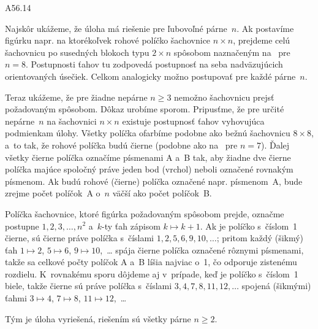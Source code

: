 {%
\fontplace[13] \hfil\Obr

\epsplace A56.14
\hfil\Obr

Najskôr ukážeme, že úloha má riešenie pre ľubovoľné párne~$n$.
Ak postavíme figúrku napr. na ktorékoľvek rohové políčko šachovnice
$n\times n$, prejdeme celú šachovnicu po susedných blokoch typu
$2\times n$ spôsobom naznačeným na \obr\ pre $n=8$. Postupnosti
ťahov tu zodpovedá postupnosť na seba nadväzujúcich orientovaných
úsečiek. Celkom analogicky možno postupovať pre každé párne~$n$.

\twocpictures

Teraz ukážeme, že pre žiadne nepárne $n\ge3$ nemožno šachovnicu prejsť
požadovaným spôsobom. Dôkaz urobíme sporom. Pripusťme, že pre
určité nepárne~$n$ na šachovnici $n\times n$ existuje postupnosť
ťahov vyhovujúca podmienkam úlohy. Všetky políčka ofarbíme
podobne ako bežnú šachovnicu $8\times 8$, a~to tak, že
rohové políčka budú čierne (podobne ako na \obr\ pre $n=7$). Ďalej
všetky čierne políčka označíme písmenami A a~B tak, aby žiadne dve
čierne políčka majúce spoločný práve jeden bod (vrchol) neboli
označené rovnakým písmenom. Ak budú rohové (čierne) políčka označené
napr. písmenom~A, bude zrejme počet políčok~A o~$n$ väčší ako počet
políčok~B.

Políčka šachovnice, ktoré figúrka požadovaným spôsobom prejde,
označme postupne $1,2,3,\dots ,n^2$ a~$k$-ty ťah zápisom
$k\mapsto k+1$. Ak je políčko s~číslom~1 čierne, sú čierne práve
políčka s~číslami $1,2,5,6,9,10,\dots$; pritom každý (šikmý) ťah
$1\mapsto2$, $5\mapsto6$, $9\mapsto10$,~\dots{} spája čierne
políčka označené rôznymi písmenami, takže sa celkové počty políčok A a~B líšia
najviac o~1, čo odporuje zistenému rozdielu. K~rovnakému sporu
dôjdeme aj v~prípade, keď je políčko s~číslom~1 biele, takže čierne
sú práve políčka s~číslami $3,4,7,8,11,12,\dots$ spojená (šikmými)
ťahmi $3\mapsto4$, $7\mapsto8$, $11\mapsto12$,~\dots{}

Tým je úloha vyriešená, riešením sú všetky párne $n\ge2$.
}

